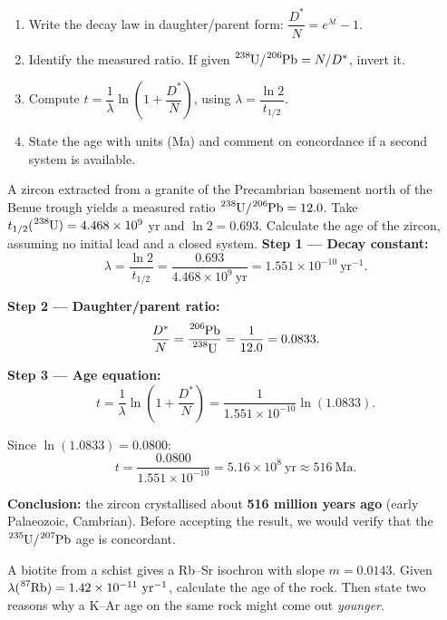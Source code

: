 \documentclass[11pt]{article}
\begin{document}
\begin{methode}
\begin{enumerate}
\item Write the decay law in daughter/parent form: $\dfrac{D^*}{N} = e^{\lambda t} - 1$.
\item Identify the measured ratio. If given $\ce{^{238}U}/\ce{^{206}Pb} = N/D^*$, invert it.
\item Compute $t = \dfrac{1}{\lambda}\ln\!\left(1 + \dfrac{D^*}{N}\right)$, using $\lambda = \dfrac{\ln 2}{t_{1/2}}$.
\item State the age with units (Ma) and comment on concordance if a second system is available.
\end{enumerate}
\end{methode}

\begin{exoresolu}
A zircon extracted from a granite of the Precambrian basement north of the Benue trough yields a measured ratio $\ce{^{238}U}/\ce{^{206}Pb} = 12.0$. Take $t_{1/2}(\ce{^{238}U}) = 4.468 \times 10^{9}$ yr and $\ln 2 = 0.693$. Calculate the age of the zircon, assuming no initial lead and a closed system.
\tcblower
\textbf{Step 1 — Decay constant:}
\[
\lambda = \frac{\ln 2}{t_{1/2}} = \frac{0.693}{4.468 \times 10^{9}\ \mathrm{yr}} = 1.551 \times 10^{-10}\ \mathrm{yr^{-1}}.
\]

\textbf{Step 2 — Daughter/parent ratio:}
\[
\frac{D^*}{N} = \frac{\ce{^{206}Pb}}{\ce{^{238}U}} = \frac{1}{12.0} = 0.0833.
\]

\textbf{Step 3 — Age equation:}
\[
t = \frac{1}{\lambda}\ln\left(1 + \frac{D^*}{N}\right)
= \frac{1}{1.551\times 10^{-10}}\ln(1.0833).
\]

Since $\ln(1.0833) = 0.0800$:
\[
t = \frac{0.0800}{1.551\times 10^{-10}} = 5.16 \times 10^{8}\ \mathrm{yr} \approx 516\ \mathrm{Ma}.
\]

\textbf{Conclusion:} the zircon crystallised about \textbf{516 million years ago} (early Palaeozoic, Cambrian). Before accepting the result, we would verify that the $\ce{^{235}U}/\ce{^{207}Pb}$ age is concordant.
\end{exoresolu}

\begin{exercice}
A biotite from a schist gives a Rb--Sr isochron with slope $m = 0.0143$. Given $\lambda(\ce{^{87}Rb}) = 1.42 \times 10^{-11}\ \mathrm{yr^{-1}}$, calculate the age of the rock. Then state two reasons why a K--Ar age on the same rock might come out \emph{younger}.
\end{exercice}
\end{document}
